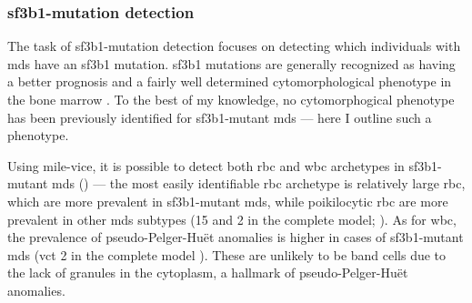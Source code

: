\begin{figure}[!ht]
    \label{fig:wbc-disease-classification-examples}
\end{figure}

\subsubsection{\ac{sf3b1}-mutation detection} 

The task of \ac{sf3b1}-mutation detection focuses on detecting which individuals with \ac{mds} have an \ac{sf3b1} mutation. \Ac{sf3b1} mutations are generally recognized as having a better prognosis and a fairly well determined cytomorphological phenotype in the bone marrow \cite{Malcovati2020-no,Hellstrom_Lindberg2015-zs,Malcovati2015-tz}. To the best of my knowledge, no cytomorphogical phenotype has been previously identified for \ac{sf3b1}-mutant \ac{mds} --- here I outline such a phenotype. 

Using \ac{mile-vice}, it is possible to detect both \ac{rbc} and \ac{wbc} archetypes in \ac{sf3b1}-mutant \ac{mds} () --- the most easily identifiable \ac{rbc} archetype is relatively large \ac{rbc}, which are more prevalent in \ac{sf3b1}-mutant \ac{mds}, while poikilocytic \ac{rbc} are more prevalent in other \ac{mds} subtypes (15 and 2 in the complete model; ). As for \ac{wbc}, the prevalence of pseudo-Pelger-Huët anomalies is higher in cases of \ac{sf3b1}-mutant \ac{mds} (\ac{vct} 2 in the complete model ). These are unlikely to be band cells due to the lack of granules in the cytoplasm, a hallmark of pseudo-Pelger-Huët anomalies.

\begin{figure}[!ht]
    \label{fig:mile-vice-vcq-so-mds-classification}
\end{figure}

